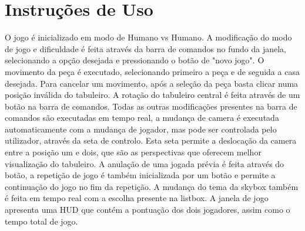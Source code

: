 \documentclass[11pt,a4paper]{report}
\begin{document}
\section{Instruções de Uso}
O jogo é inicializado em modo de Humano vs Humano. A modificação do modo de jogo e dificuldade é feita através da barra de comandos no fundo da janela, selecionando a opção desejada e pressionando o botão de "novo jogo".
O movimento da peça é executado, selecionando primeiro a peça e de seguida a casa desejada. Para cancelar um movimento, após a seleção da peça basta clicar numa posição inválida do tabuleiro.
A rotação do tabuleiro central é feita através de um botão na barra de comandos.
Todas as outras modificações presentes na barra de comandos são executadas em tempo real, a mudança de camera é executada automaticamente com a mudança de jogador, mas pode ser controlada pelo utilizador, através da seta de controlo. Esta seta permite a deslocação da camera entre a posição um e dois, que são as perspectivas que oferecem melhor visualização do tabuleiro.
A anulação de uma jogada prévia é feita através do botão, a repetição de jogo é também inicializada por um botão e permite a continuação do jogo no fim da repetição.
A mudança do tema da skybox também é feita em tempo real com a escolha presente na listbox.
A janela de jogo apresenta uma HUD que contém a pontuação dos dois jogadores, assim como o tempo total de jogo.
\end{document}
